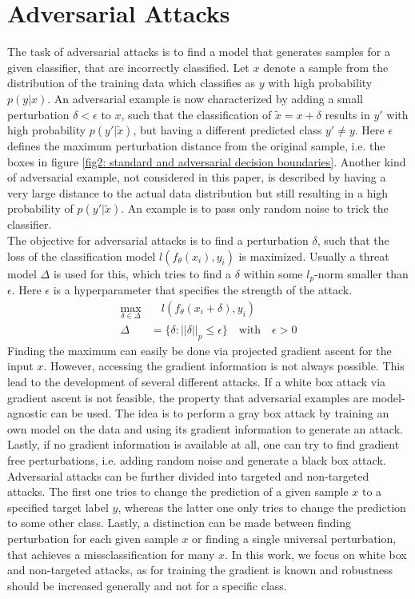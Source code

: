\documentclass{article}
\begin{document}
\section{Adversarial Attacks}
  
The task of adversarial attacks is to find a model that generates samples for a given classifier, that are incorrectly classified. Let $x$ denote a sample from the distribution of the training data which classifies as $y$ with high probability $p(y|x)$. An adversarial example is now characterized by adding a small perturbation $\delta < \epsilon$ to $x$, such that the classification of $\tilde{x} = x + \delta$ results in $y'$ with high probability $p(y'|\tilde{x})$, but having a different predicted class $y' \neq y$. Here $\epsilon$ defines the maximum perturbation distance from the original sample, i.e. the boxes in figure \ref{fig2: standard and adversarial decision boundaries}. Another kind of adversarial example, not considered in this paper, is described by having a very large distance to the actual data distribution but still resulting in a high probability of $p(y'|\tilde{x})$. An example is to pass only random noise to trick the classifier. \\
The objective for adversarial attacks is to find a perturbation $\delta$, such that the loss of the classification model $l(f_{\theta}(x_i), y_i)$ is maximized. Usually a threat model $\Delta$ is used for this, which tries to find a $\delta$ within some $l_p$-norm smaller than $\epsilon$. Here $\epsilon$ is a hyperparameter that specifies the strength of the attack. 
\vspace{-0.2cm}
\begin{align*}
  \max_{\delta \in \Delta} & \quad l(f_{\theta}(x_i + \delta), y_i)  \\
  \Delta &= \{\delta : ||\delta||_p \leq \epsilon\} \quad \text{with} \quad \epsilon > 0
\end{align*}
Finding the maximum can easily be done via projected gradient ascent for the input $x$. However, accessing the gradient information is not always possible. This lead to the development of several different attacks. If a white box attack via gradient ascent is not feasible, the property that adversarial examples are model-agnostic can be used. The idea is to perform a gray box attack by training an own model on the data and using its gradient information to generate an attack. Lastly, if no gradient information is available at all, one can try to find gradient free perturbations, i.e. adding random noise and generate a black box attack. \\
Adversarial attacks can be further divided into targeted and non-targeted attacks. The first one tries to change the prediction of a given sample $x$ to a specified target label $y$, whereas the latter one only tries to change the prediction to some other class. Lastly, a distinction can be made between finding perturbation for each given sample $x$ or finding a single universal perturbation, that achieves a missclassification for many $x$. In this work, we focus on white box and non-targeted attacks, as for training the gradient is known and robustness should be increased generally and not for a specific class. 
  
\end{document}
